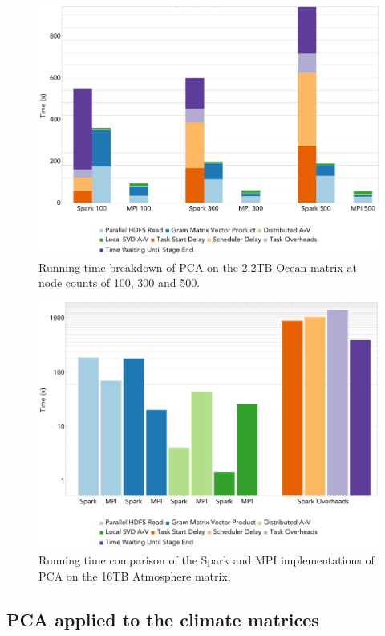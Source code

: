 \begin{figure}[th!]
\centering
\includegraphics[width=\textwidth]{fig/ocean_pca_times.png}
\caption{Running time breakdown of PCA on the 2.2TB Ocean matrix at node counts of 100, 300 and 500.}
\label{fig:pcart}
\end{figure}

\begin{figure}[th!]
\centering
\includegraphics[width=\textwidth]{fig/hero_pca_times.png}
\caption{Running time comparison of the Spark and MPI implementations of PCA on the 16TB Atmosphere matrix.}
\label{fig:hero}
\end{figure}

\subsection{PCA applied to the climate matrices}

